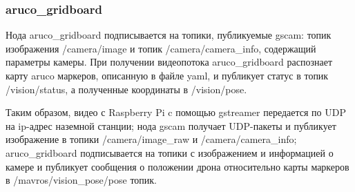 
\subsubsection{aruco\_gridboard}
Нода aruco\_gridboard подписывается на топики, публикуемые gscam: топик изображения /camera/image и топик /camera/camera\_info, содержащий параметры камеры. При получении видеопотока aruco\_gridboard распознает карту aruco маркеров, описанную в файле yaml, и публикует статус в топик /vision/status, а полученные координаты в /vision/pose.

Таким образом, видео с Raspberry Pi c помощью gstreamer передается по UDP на ip-адрес наземной станции; нода gscam получает UDP-пакеты и публикует изображение в топики /camera/image\_raw и /camera/camera\_info; aruco\_gridboard подписывается на топики с изображением и информацией о камере и публикует сообщения о положении дрона относительно карты маркеров в /mavros/vision\_pose/pose топик.


